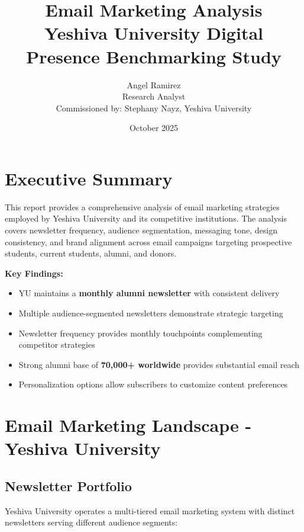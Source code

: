 \documentclass[12pt,letterpaper]{article}
\title{\textbf{Email Marketing Analysis}\\
\large Yeshiva University Digital Presence Benchmarking Study}
\author{Angel Ramirez\\
\small Research Analyst\\
\small Commissioned by: Stephany Nayz, Yeshiva University}
\date{October 2025}
\begin{document}
\maketitle

\section*{Executive Summary}

This report provides a comprehensive analysis of email marketing strategies employed by Yeshiva University and its competitive institutions. The analysis covers newsletter frequency, audience segmentation, messaging tone, design consistency, and brand alignment across email campaigns targeting prospective students, current students, alumni, and donors.

\textbf{Key Findings:}
\begin{itemize}[leftmargin=*]
    \item YU maintains a \textbf{monthly alumni newsletter} with consistent delivery
    \item Multiple audience-segmented newsletters demonstrate strategic targeting
    \item Newsletter frequency provides monthly touchpoints complementing competitor strategies
    \item Strong alumni base of \textbf{70,000+ worldwide} provides substantial email reach
    \item Personalization options allow subscribers to customize content preferences
\end{itemize}

\section{Email Marketing Landscape - Yeshiva University}

\subsection{Newsletter Portfolio}

Yeshiva University operates a multi-tiered email marketing system with distinct newsletters serving different audience segments:
\end{document}
